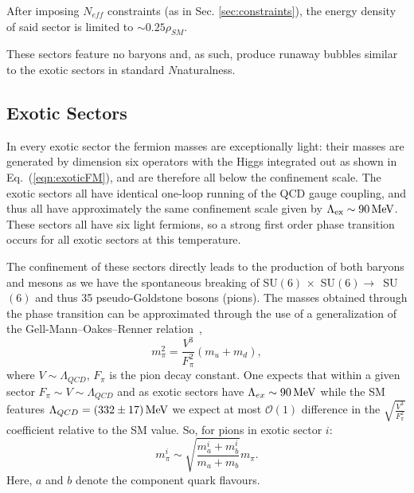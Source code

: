 \documentclass[nofootinbib,twocolumn,preprintnumbers]{revtex4-1}
\begin{document}

After imposing $N_{eff}$ constraints (as in Sec. \ref{sec:constraints}), the energy density of said sector is limited to $\sim 0.25\rho_{SM}$.

These sectors feature no baryons and, as such, produce runaway bubbles similar to the exotic sectors in standard $N$naturalness.  

\subsection{Exotic Sectors}

In every exotic sector the fermion masses are exceptionally light: their masses are generated by dimension six operators with the Higgs integrated out as shown in Eq.~(\ref{eqn:exoticFM}), and are therefore all below the confinement scale. The exotic sectors all have identical one-loop running of the QCD gauge coupling, and thus all have approximately the same confinement scale given by $\Lambda_{\rm ex} \sim 90 \,\mathrm{MeV}$. These sectors all have six light fermions, so a strong first order phase transition occurs for all exotic sectors at this temperature. 

The confinement of these sectors directly leads to the production of both baryons and mesons as we have the spontaneous breaking of SU$(6) \,\times$ SU$(6) \rightarrow\,$ SU$(6)$ and thus 35 pseudo-Goldstone bosons (pions). The masses obtained through the phase transition can be approximated through the use of a generalization of the Gell-Mann--Oakes--Renner relation~\cite{Gell-Mann,Schwartz:2013pla},
\begin{equation}\label{eqn:gmor}
m^2_{\pi} = \frac{V^3}{F^2_{\pi}}(m_u + m_d),
\end{equation}
where $V \sim \Lambda_{QCD}$, $F_\pi$ is the pion decay constant. One expects that within a given sector $F_\pi \sim V \sim \Lambda_{QCD}$ \cite{Schwartz:2013pla} and as exotic sectors have $\Lambda_{ex} \sim 90 \,{\rm MeV}$ while the SM features $\Lambda_{QCD} = (332\pm17)\,{\rm MeV}$ \cite{PhysRevD.98.030001} we expect at most $\mathcal{O}(1)$ difference in the $\sqrt{\frac{V^3}{F_\pi^2}}$ coefficient relative to the SM value. So, for pions in exotic sector $i$:
\begin{equation}
m_{\pi}^i \sim \sqrt{\frac{m_a^i+m_b^i}{m_a + m_b}} m_{\pi}.
\end{equation}
Here, $a$ and $b$ denote the component quark flavours. 
\end{document}
